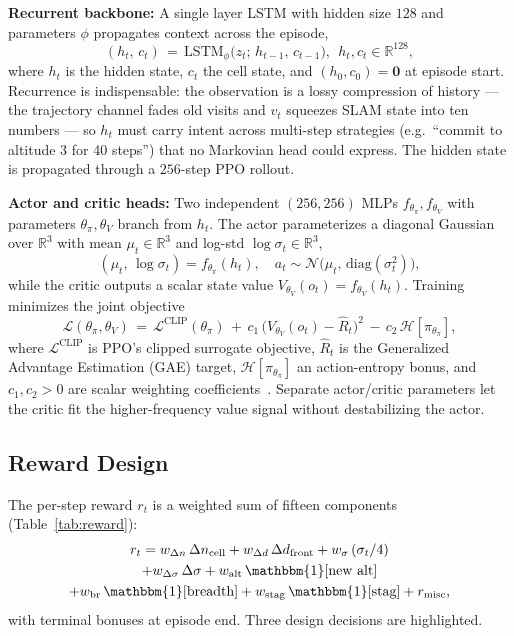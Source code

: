 \documentclass[conference]{IEEEtran}
\begin{document}
\textbf{Recurrent backbone:} A single layer LSTM with hidden size $128$ and parameters $\phi$ propagates context across the episode,
\begin{equation}
(h_t,\,c_t) \,=\, \mathrm{LSTM}_{\phi}\!\big(z_t;\, h_{t-1},\, c_{t-1}\big),\ \ h_t,c_t\!\in\!\mathbb{R}^{128},
\label{eq:lstm}
\end{equation}
where $h_t$ is the hidden state, $c_t$ the cell state, and $(h_0,c_0)\!=\!\mathbf{0}$ at episode start. Recurrence is indispensable: the observation is a lossy compression of history --- the trajectory channel fades old visits and $v_t$ squeezes SLAM state into ten numbers --- so $h_t$ must carry intent across multi-step strategies (e.g.\ ``commit to altitude 3 for 40 steps'') that no Markovian head could express. The hidden state is propagated through a $256$-step PPO rollout.

\textbf{Actor and critic heads:} Two independent $(256,256)$ MLPs $f_{\theta_\pi}, f_{\theta_V}$ with parameters $\theta_\pi, \theta_V$ branch from $h_t$. The actor parameterizes a diagonal Gaussian over $\mathbb{R}^3$ with mean $\mu_t\!\in\!\mathbb{R}^3$ and log-std $\log\sigma_t\!\in\!\mathbb{R}^3$,
\begin{equation}
(\mu_t,\,\log\sigma_t) = f_{\theta_\pi}(h_t),\quad a_t \sim \mathcal{N}\!\big(\mu_t,\,\mathrm{diag}(\sigma_t^2)\big),
\label{eq:actor}
\end{equation}
while the critic outputs a scalar state value $V_{\theta_V}(o_t)\!=\!f_{\theta_V}(h_t)$. Training minimizes the joint objective
\begin{equation}
\mathcal{L}(\theta_\pi,\theta_V) \,=\, \mathcal{L}^{\text{CLIP}}(\theta_\pi) \,+\, c_1\,\big(V_{\theta_V}(o_t)\!-\!\hat{R}_t\big)^2 \,-\, c_2\,\mathcal{H}[\pi_{\theta_\pi}],
\label{eq:ppo_loss}
\end{equation}
where $\mathcal{L}^{\text{CLIP}}$ is PPO's clipped surrogate objective, $\hat{R}_t$ is the Generalized Advantage Estimation (GAE) target, $\mathcal{H}[\pi_{\theta_\pi}]$ an action-entropy bonus, and $c_1,c_2\!>\!0$ are scalar weighting coefficients~\cite{raffin2021sb3}. Separate actor/critic parameters let the critic fit the higher-frequency value signal without destabilizing the actor.

\subsection{Reward Design}\label{sec:reward}
The per-step reward $r_t$ is a weighted sum of fifteen components (Table~\ref{tab:reward}):
\begin{multline}
    r_t = w_{\Delta n}\,\Delta n_{\text{cell}} + w_{\Delta d}\,\Delta d_{\text{front}} + w_\sigma\,(\sigma_t/4) \\
    + w_{\Delta\sigma}\,\Delta\sigma + w_{\text{alt}}\,\mathbbm{1}[\text{new alt}] \\
    + w_{\text{br}}\,\mathbbm{1}[\text{breadth}] + w_{\text{stag}}\,\mathbbm{1}[\text{stag}] + r_{\text{misc}},
\end{multline}
with terminal bonuses at episode end. Three design decisions are highlighted.
\end{document}
